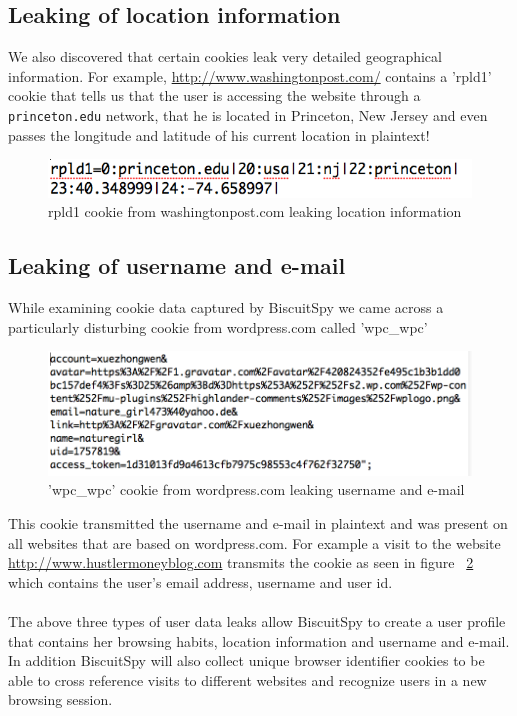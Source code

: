 \subsection{Leaking of location information}
We also discovered that certain cookies leak very detailed geographical information. For example, \url{http://www.washingtonpost.com/} contains a 'rpld1' cookie that tells us that the user is accessing the website through a \texttt{princeton.edu} network, that he is located in Princeton, New Jersey and even passes the longitude and latitude of his current location in plaintext!

\begin{figure}[h]
\centering
\includegraphics[scale=0.5]{./diagrams/location.png}
\caption{rpld1 cookie from washingtonpost.com leaking location information}
\label{fig:location}
\end{figure}


\subsection{Leaking of username and e-mail}

While examining cookie data captured by BiscuitSpy we came across a particularly disturbing cookie from wordpress.com called 'wpc\_wpc'
\begin{figure}[h]
\centering
\includegraphics[scale=0.4]{./diagrams/wpc.png}
\caption{'wpc\_wpc' cookie from wordpress.com leaking username and e-mail}
\label{fig:wpc}
\end{figure}

 This cookie transmitted the username and e-mail in plaintext and was present on all websites that are based on wordpress.com. For example a visit to the website \url{http://www.hustlermoneyblog.com} transmits the cookie as seen in figure ~\ref{fig:wpc} which contains the user's email address, username and user id.
\\
\\
The above three types of user data leaks allow BiscuitSpy to create a user profile that contains her browsing habits, location information and username and e-mail. In addition BiscuitSpy will also collect unique browser identifier cookies to be able to cross reference visits to different websites and recognize users in a new browsing session.

